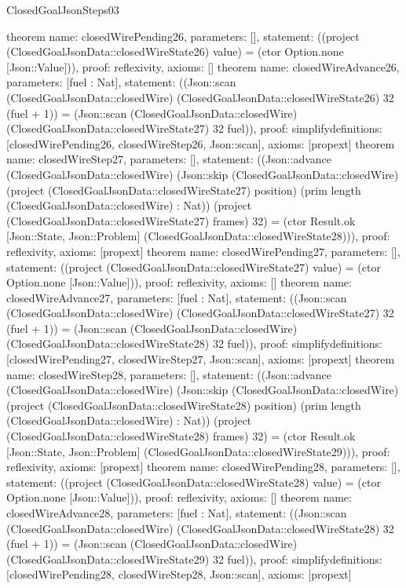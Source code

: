 \begin{lexlean}{ClosedGoalJsonSteps03}
\begin{semanticmodule}
{}
theorem{
 name: closedWirePending26, parameters: [],
 statement: ((project (ClosedGoalJsonData::closedWireState26) value) = (ctor Option.none [Json::Value])), proof: reflexivity{}, axioms: []
}
theorem{
 name: closedWireAdvance26, parameters: [fuel : Nat],
 statement: ((Json::scan (ClosedGoalJsonData::closedWire) (ClosedGoalJsonData::closedWireState26) 32 (fuel + 1)) = (Json::scan (ClosedGoalJsonData::closedWire) (ClosedGoalJsonData::closedWireState27) 32 fuel)), proof: simplify{definitions: [closedWirePending26, closedWireStep26, Json::scan]}, axioms: [propext]
}
theorem{
 name: closedWireStep27, parameters: [],
 statement: ((Json::advance (ClosedGoalJsonData::closedWire) (Json::skip (ClosedGoalJsonData::closedWire) (project (ClosedGoalJsonData::closedWireState27) position) (prim length (ClosedGoalJsonData::closedWire) : Nat)) (project (ClosedGoalJsonData::closedWireState27) frames) 32) = (ctor Result.ok [Json::State, Json::Problem] (ClosedGoalJsonData::closedWireState28))), proof: reflexivity{}, axioms: [propext]
}
theorem{
 name: closedWirePending27, parameters: [],
 statement: ((project (ClosedGoalJsonData::closedWireState27) value) = (ctor Option.none [Json::Value])), proof: reflexivity{}, axioms: []
}
theorem{
 name: closedWireAdvance27, parameters: [fuel : Nat],
 statement: ((Json::scan (ClosedGoalJsonData::closedWire) (ClosedGoalJsonData::closedWireState27) 32 (fuel + 1)) = (Json::scan (ClosedGoalJsonData::closedWire) (ClosedGoalJsonData::closedWireState28) 32 fuel)), proof: simplify{definitions: [closedWirePending27, closedWireStep27, Json::scan]}, axioms: [propext]
}
theorem{
 name: closedWireStep28, parameters: [],
 statement: ((Json::advance (ClosedGoalJsonData::closedWire) (Json::skip (ClosedGoalJsonData::closedWire) (project (ClosedGoalJsonData::closedWireState28) position) (prim length (ClosedGoalJsonData::closedWire) : Nat)) (project (ClosedGoalJsonData::closedWireState28) frames) 32) = (ctor Result.ok [Json::State, Json::Problem] (ClosedGoalJsonData::closedWireState29))), proof: reflexivity{}, axioms: [propext]
}
theorem{
 name: closedWirePending28, parameters: [],
 statement: ((project (ClosedGoalJsonData::closedWireState28) value) = (ctor Option.none [Json::Value])), proof: reflexivity{}, axioms: []
}
theorem{
 name: closedWireAdvance28, parameters: [fuel : Nat],
 statement: ((Json::scan (ClosedGoalJsonData::closedWire) (ClosedGoalJsonData::closedWireState28) 32 (fuel + 1)) = (Json::scan (ClosedGoalJsonData::closedWire) (ClosedGoalJsonData::closedWireState29) 32 fuel)), proof: simplify{definitions: [closedWirePending28, closedWireStep28, Json::scan]}, axioms: [propext]
}
\end{semanticmodule}
\end{lexlean}
